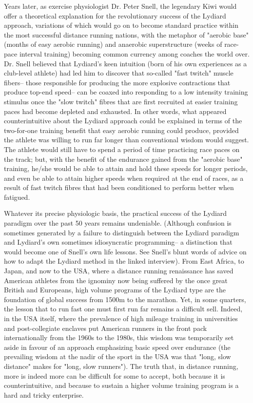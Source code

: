 Years later, as exercise physiologist Dr. Peter Snell, the legendary Kiwi would offer a theoretical explanation for the revolutionary success of the Lydiard approach, variations of which would go on to become standard practice within the most successful distance running nations, with the metaphor of "aerobic base" (months of easy aerobic running) and anaerobic superstructure (weeks of race-pace interval training) becoming common currency among coaches the world over. Dr. Snell believed that Lydiard's keen intuition (born of his own experiences as a club-level athlete) had led him to discover that so-called "fast twitch" muscle fibers-- those responsible for producing the more explosive contractions that produce top-end speed-- can be coaxed into responding to a low intensity training stimulus once the "slow twitch" fibres that are first recruited at easier training paces had become depleted and exhausted. In other words, what appeared counterintuitive about the Lydiard approach could be explained in terms of the two-for-one training benefit that easy aerobic running could produce, provided the athlete was willing to run far longer than conventional wisdom would suggest. The athlete would still have to spend a period of time practicing race paces on the track; but, with the benefit of the endurance gained from the "aerobic base" training, he/she would be able to attain and hold these speeds for longer periods, and even be able to attain higher speeds when required at the end of races, as a result of fast twitch fibres that had been conditioned to perform better when fatigued.

Whatever its precise physiologic basis, the practical success of the Lydiard paradigm over the past 50 years remains undeniable. (Although confusion is sometimes generated by a failure to distinguish between the Lydiard paradigm and Lydiard's own sometimes idiosyncratic programming-- a distinction that would become one of Snell's own life lessons. See Snell's blunt words of advice on how to adapt the Lydiard method in the linked interview). From East Africa, to Japan, and now to the USA, where a distance running renaissance has saved American athletes from the ignominy now being suffered by the once great British and Europeans, high volume programs of the Lydiard type are the foundation of global success from 1500m to the marathon. Yet, in some quarters, the lesson that to run fast one must first run far remains a difficult sell. Indeed, in the USA itself, where the prevalence of high mileage training in universities and post-collegiate enclaves put American runners in the front pack internationally from the 1960s to the 1980s, this wisdom was temporarily set aside in favour of an approach emphasizing basic speed over endurance (the prevailing wisdom at the nadir of the sport in the USA was that "long, slow distance" makes for "long, slow runners"). The truth that, in distance running, more is indeed more can be difficult for some to accept, both because it is counterintuitive, and because to sustain a higher volume training program is a hard and tricky enterprise.

